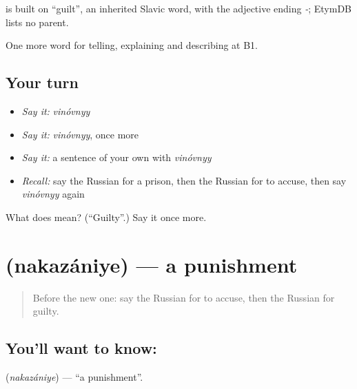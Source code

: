 \begin{cousinweb}
\emph{} is built on \emph{} \textquotedblleft{}guilt\textquotedblright{}, an inherited Slavic word, with the adjective ending \emph{-}; EtymDB lists no parent.
\end{cousinweb}

\begin{grammarlens}[title={What you've built}]
One more word for telling, explaining and describing at B1.
\end{grammarlens}

\subsection*{Your turn}
\begin{itemize}
\raggedright
  \item \emph{Say it:} \emph{vinóvnyy}
  \item \emph{Say it:} \emph{vinóvnyy}, once more
  \item \emph{Say it:} a sentence of your own with \emph{vinóvnyy}
  \item \emph{Recall:} say the Russian for a prison, then the Russian for to accuse, then say \emph{vinóvnyy} again
\end{itemize}

\begin{tcolorbox}[breakable,colback=teal!4,colframe=teal!35!black,title={Before you move on}]
What does  mean? (\textquotedblleft{}Guilty\textquotedblright{}.) Say it once more.
\end{tcolorbox}
\section[\texorpdfstring{\ru{наказание} (nakazániye)}{наказание (nakazániye)}]{ (nakazániye) — a punishment}

\label{lesson:RU-C294-nakazaniye}



\begin{quote}
Before the new one: say the Russian for to accuse, then the Russian for guilty.
\end{quote}

\subsection*{You'll want to know: }
\textbf{} (\emph{nakazániye}) — \textquotedblleft{}a punishment\textquotedblright{}.

